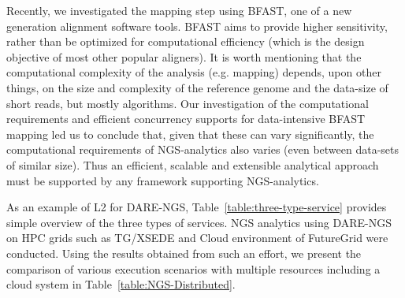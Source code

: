 \documentclass[]{svjour3}
\begin{document}
Recently, we investigated the mapping step using BFAST, one of a new
generation alignment software tools. BFAST aims to provide higher
sensitivity, rather than be optimized for computational efficiency
(which is the design objective of most other popular aligners).
It is worth mentioning that the computational complexity of the
analysis (e.g. mapping) depends, upon other things, on the size and
complexity of the reference genome and the data-size of short reads,
but mostly algorithms\cite{dare-ecmls11}.  Our investigation of the
computational requirements and efficient concurrency supports for
data-intensive BFAST mapping led us to conclude that, given that these
can vary significantly, the computational requirements of
NGS-analytics also varies (even between data-sets of similar
size). Thus an efficient, scalable and extensible analytical approach
must be supported by any framework supporting NGS-analytics.


As an example of L2 for DARE-NGS, Table~\ref{table:three-type-service}
provides simple overview of the three types of services.
NGS analytics using DARE-NGS on HPC grids such as TG/XSEDE and Cloud
environment of FutureGrid were conducted\cite{dare-ecmls11}. Using the
results obtained from such an effort, we present the comparison of
various execution scenarios with multiple resources including a cloud
system in Table~\ref{table:NGS-Distributed}. 
\end{document}
